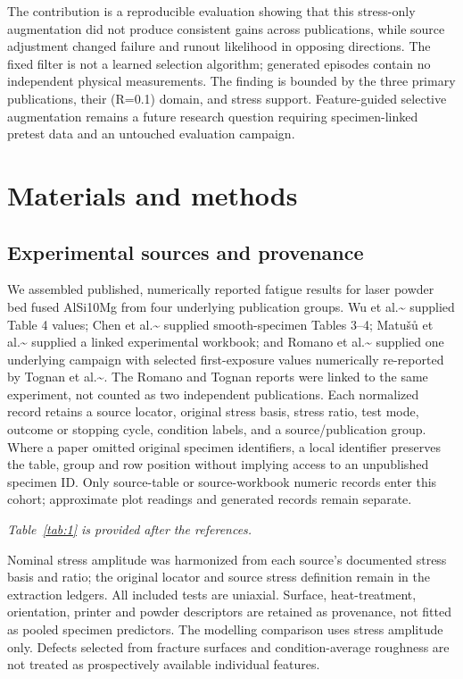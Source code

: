 \documentclass[12pt,a4paper]{article}
\begin{document}
The contribution is a reproducible evaluation showing that this stress-only augmentation did not produce consistent gains across publications, while source adjustment changed failure and runout likelihood in opposing directions. The fixed filter is not a learned selection algorithm; generated episodes contain no independent physical measurements. The finding is bounded by the three primary publications, their (R=0.1) domain, and stress support. Feature-guided selective augmentation remains a future research question requiring specimen-linked pretest data and an untouched evaluation campaign.

\section{Materials and methods}

\subsection{Experimental sources and provenance}

We assembled published, numerically reported fatigue results for laser powder bed fused AlSi10Mg from four underlying publication groups. Wu et al.\textasciitilde{}\cite{wu2021} supplied Table 4 values; Chen et al.\textasciitilde{}\cite{chen2024} supplied smooth-specimen Tables 3–4; Matušů et al.\textasciitilde{}\cite{matusu2026} supplied a linked experimental workbook; and Romano et al.\textasciitilde{}\cite{romano2018} supplied one underlying campaign with selected first-exposure values numerically re-reported by Tognan et al.\textasciitilde{}\cite{tognan2023}. The Romano and Tognan reports were linked to the same experiment, not counted as two independent publications. Each normalized record retains a source locator, original stress basis, stress ratio, test mode, outcome or stopping cycle, condition labels, and a source/publication group. Where a paper omitted original specimen identifiers, a local identifier preserves the table, group and row position without implying access to an unpublished specimen ID. Only source-table or source-workbook numeric records enter this cohort; approximate plot readings and generated records remain separate.

\noindent\textit{Table~\ref{tab:1} is provided after the references.}\par

Nominal stress amplitude was harmonized from each source’s documented stress basis and ratio; the original locator and source stress definition remain in the extraction ledgers. All included tests are uniaxial. Surface, heat-treatment, orientation, printer and powder descriptors are retained as provenance, not fitted as pooled specimen predictors. The modelling comparison uses stress amplitude only. Defects selected from fracture surfaces and condition-average roughness are not treated as prospectively available individual features.
\end{document}
